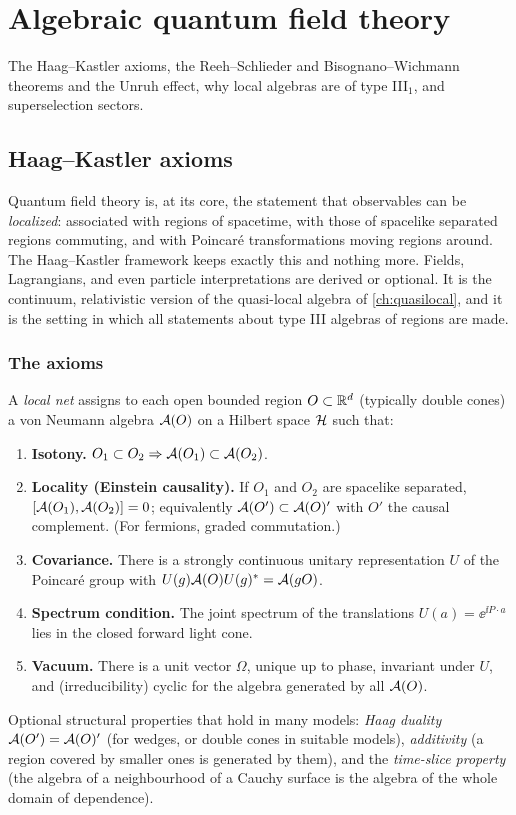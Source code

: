 \chapter{Algebraic quantum field theory}\label{ch:aqft}

The Haag--Kastler axioms, the Reeh--Schlieder and Bisognano--Wichmann theorems and the Unruh effect, why local algebras are of type III$_1$, and superselection sectors.

\section{Haag--Kastler axioms}\label{ch:haagkastler}

\begin{physmotiv}
Quantum field theory is, at its core, the statement that observables can be \emph{localized}: associated with regions of spacetime, with those of spacelike separated regions commuting, and with Poincar\'e transformations moving regions around. The Haag--Kastler framework keeps exactly this and nothing more. Fields, Lagrangians, and even particle interpretations are derived or optional. It is the continuum, relativistic version of the quasi-local algebra of \cref{ch:quasilocal}, and it is the setting in which all statements about type III algebras of regions are made.
\end{physmotiv}

\subsection{The axioms}

A \emph{local net} assigns to each open bounded region $O\subset\mathbb{R}^{d}$ (typically double cones) a von Neumann algebra $\mathcal{A}(O)$ on a Hilbert space $\mathcal{H}$ such that:
\begin{enumerate}[label=(HK\arabic*)]
\item \textbf{Isotony.} $O_1\subset O_2\Rightarrow\mathcal{A}(O_1)\subset\mathcal{A}(O_2)$.
\item \textbf{Locality (Einstein causality).} If $O_1$ and $O_2$ are spacelike separated, $[\mathcal{A}(O_1),\mathcal{A}(O_2)]=0$; equivalently $\mathcal{A}(O')\subset\mathcal{A}(O)'$ with $O'$ the causal complement. (For fermions, graded commutation.)
\item \textbf{Covariance.} There is a strongly continuous unitary representation $U$ of the Poincar\'e group with $U(g)\mathcal{A}(O)U(g)^{*}=\mathcal{A}(gO)$.
\item \textbf{Spectrum condition.} The joint spectrum of the translations $U(a)=\ee^{\ii P\cdot a}$ lies in the closed forward light cone.
\item \textbf{Vacuum.} There is a unit vector $\Omega$, unique up to phase, invariant under $U$, and (irreducibility) cyclic for the algebra generated by all $\mathcal{A}(O)$.
\end{enumerate}
Optional structural properties that hold in many models: \emph{Haag duality} $\mathcal{A}(O')=\mathcal{A}(O)'$ (for wedges, or double cones in suitable models), \emph{additivity} (a region covered by smaller ones is generated by them), and the \emph{time-slice property} (the algebra of a neighbourhood of a Cauchy surface is the algebra of the whole domain of dependence).

